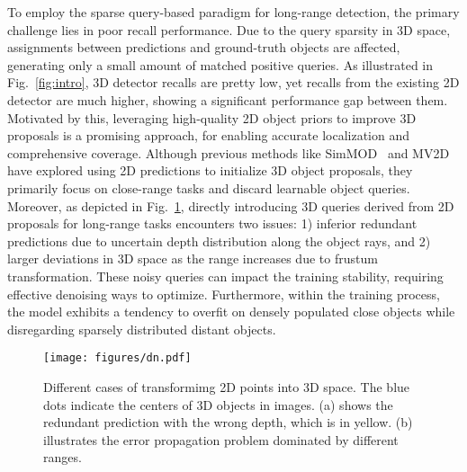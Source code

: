 \documentclass[letterpaper]{article} \usepackage{aaai24}
\begin{document}
To employ the sparse query-based paradigm for long-range detection, the primary challenge lies in poor recall performance. Due to the query sparsity in 3D space, assignments between predictions and ground-truth objects are affected, generating only a small amount of matched positive queries. 
As illustrated in Fig.~\ref{fig:intro}, 3D detector recalls are pretty low, yet recalls from the existing 2D detector are much higher, showing a significant performance gap between them. Motivated by this, leveraging high-quality 2D object priors to improve 3D proposals is a promising approach, for enabling accurate localization and comprehensive coverage. Although previous methods like SimMOD~\cite{zhang2023simple} and MV2D~\cite{wang2023object} have explored using 2D predictions to initialize 3D object proposals, they primarily focus on close-range tasks and discard learnable object queries. 
Moreover, as depicted in Fig.~\ref{fig:dn}, directly introducing 3D queries derived from 2D proposals for long-range tasks encounters two issues: 1) inferior redundant predictions due to uncertain depth distribution along the object rays, and 2) larger deviations in 3D space as the range increases due to frustum transformation. These noisy queries can impact the training stability, requiring effective denoising ways to optimize. Furthermore, within the training process, the model exhibits a tendency to overfit on densely populated close objects while disregarding sparsely distributed distant objects.



\begin{figure}[t]
\centering
\texttt{[image: figures/dn.pdf]}
\caption{Different cases of transformimg 2D points into 3D space. The blue dots indicate the centers of 3D objects in images. (a) shows the redundant prediction with the wrong depth, which is in yellow. (b) illustrates the error propagation problem dominated by different ranges.}
\label{fig:dn}
\vspace{-0.5cm}
\end{figure}
\end{document}
